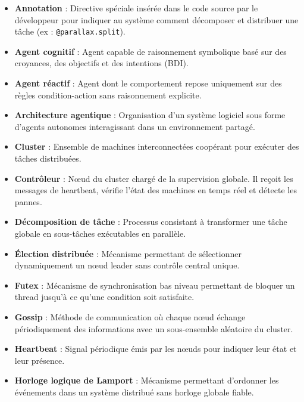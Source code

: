 \documentclass[12pt,a4paper]{report}
\begin{document}
\begin{itemize}

\item[*] \textbf{Annotation} : Directive spéciale insérée dans le code source par le développeur pour indiquer au système comment décomposer et distribuer une tâche (ex : \texttt{@parallax.split}).

\item[*] \textbf{Agent cognitif} : Agent capable de raisonnement symbolique basé sur des croyances, des objectifs et des intentions (BDI).

\item[*] \textbf{Agent réactif} : Agent dont le comportement repose uniquement sur des règles condition-action sans raisonnement explicite.

\item[*] \textbf{Architecture agentique} : Organisation d'un système logiciel sous forme d'agents autonomes interagissant dans un environnement partagé.

\item[*] \textbf{Cluster} : Ensemble de machines interconnectées coopérant pour exécuter des tâches distribuées.

\item[*] \textbf{Contrôleur} : Nœud du cluster chargé de la supervision globale. Il reçoit les messages de heartbeat, vérifie l'état des machines en temps réel et détecte les pannes.

\item[*] \textbf{Décomposition de tâche} : Processus consistant à transformer une tâche globale en sous-tâches exécutables en parallèle.

\item[*] \textbf{Élection distribuée} : Mécanisme permettant de sélectionner dynamiquement un nœud leader sans contrôle central unique.

\item[*] \textbf{Futex} : Mécanisme de synchronisation bas niveau permettant de bloquer un thread jusqu'à ce qu'une condition soit satisfaite.

\item[*] \textbf{Gossip} : Méthode de communication où chaque nœud échange périodiquement des informations avec un sous-ensemble aléatoire du cluster.

\item[*] \textbf{Heartbeat} : Signal périodique émis par les nœuds pour indiquer leur état et leur présence.

\item[*] \textbf{Horloge logique de Lamport} : Mécanisme permettant d'ordonner les événements dans un système distribué sans horloge globale fiable.


\end{itemize}
\end{document}

